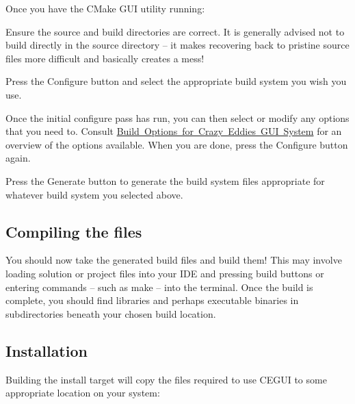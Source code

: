 Once you have the C\+Make G\+UI utility running\+:
\begin{DoxyItemize}
\item Ensure the source and build directories are correct. It is generally advised not to build directly in the source directory – it makes recovering back to \textquotesingle{}pristine\textquotesingle{} source files more difficult and basically creates a mess!
\item Press the Configure button and select the appropriate build system you wish you use.
\item Once the initial configure pass has run, you can then select or modify any options that you need to. Consult \mbox{\hyperlink{build_options}{Build Options for Crazy Eddie\textquotesingle{}s G\+UI System}} for an overview of the options available. When you are done, press the Configure button again.
\item Press the Generate button to generate the build system files appropriate for whatever build system you selected above. 
\end{DoxyItemize}\hypertarget{compiling_compiling_build_build}{}\subsection{Compiling the files}\label{compiling_compiling_build_build}
You should now take the generated build files and build them! This may involve loading solution or project files into your I\+DE and pressing build buttons or entering commands – such as {\ttfamily make} – into the terminal. Once the build is complete, you should find libraries and perhaps executable binaries in subdirectories beneath your chosen build location. \hypertarget{compiling_compiling_build_install}{}\subsection{Installation}\label{compiling_compiling_build_install}
Building the \textquotesingle{}install\textquotesingle{} target will copy the files required to use C\+E\+G\+UI to some appropriate location on your system\+:
